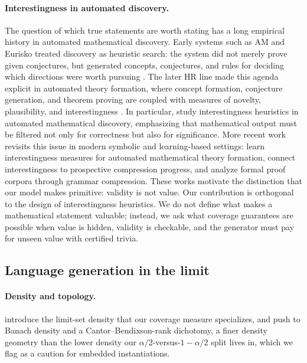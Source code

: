\documentclass[11pt]{article}
\numberwithin{equation}{section}
\theoremstyle{plain}
\theoremstyle{definition}
\theoremstyle{remark}
\begin{document}
\paragraph{Interestingness in automated discovery.}
The question of which true statements are worth stating has a long empirical history in
automated mathematical discovery. Early systems such as AM and Eurisko treated discovery as
heuristic search: the system did not merely prove given conjectures, but generated concepts,
conjectures, and rules for deciding which directions were worth pursuing
\citep{lenat1977automated,lenat1983eurisko}. The later HR line made this agenda explicit in
automated theory formation, where concept formation, conjecture generation, and theorem
proving are coupled with measures of novelty, plausibility, and interestingness
\citep{colton1999automatic,colton2002automated}. In particular,
\citet{colton2000interestingness} study interestingness heuristics in automated mathematical
discovery, emphasizing that mathematical output must be filtered not only for correctness but
also for significance. More recent work revisits this issue in modern symbolic and
learning-based settings: \citet{tsoukalas2025interestingness} learn interestingness measures
for automated mathematical theory formation, \citet{herrmann2026interestingness} connect
interestingness to prospective compression progress, and \citet{wernhard2025grammar} analyze
formal proof corpora through grammar compression. These works motivate the distinction that
our model makes primitive: validity is not value. Our contribution is orthogonal to the design
of interestingness heuristics. We do not define what makes a mathematical statement valuable;
instead, we ask what coverage guarantees are possible when value is hidden, validity is
checkable, and the generator must pay for unseen value with certified trivia.

\subsection{Language generation in the limit}
\paragraph{Density and topology.}
 introduce the limit-set density that our coverage measure
specializes, and \citet{kleinberg2026banach} push to Banach density and a
Cantor--Bendixson-rank dichotomy, a finer density geometry than the lower density our
$\alpha/2$-versus-$1-\alpha/2$ split lives in, which we flag as a caution for embedded
instantiations.
\end{document}
